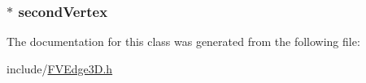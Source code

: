 \label{d1/d9c/classFVEdge3D_a0a063e99fbc85e837d93dfbcda6f5252}
\hypertarget{classFVEdge3D_a1022ea9cc9a93a6cea8eec59c092593a}{
\subsubsection[{secondVertex}]{ $\ast$ {\bf secondVertex}}}
\label{d1/d9c/classFVEdge3D_a1022ea9cc9a93a6cea8eec59c092593a}


The documentation for this class was generated from the following file:\begin{DoxyCompactItemize}
\item 
include/\hyperlink{FVEdge3D_8h}{FVEdge3D.h}\end{DoxyCompactItemize}
